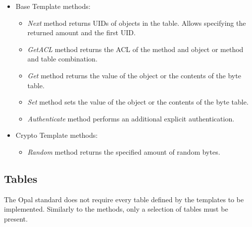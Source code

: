 \begin{itemize}
    \item Base Template methods:
\begin{itemize}
\item \emph{Next} method returns UIDs of objects in the table. Allows specifying the returned amount and the first UID.
\item \emph{GetACL} method returns the ACL of the method and object or method and table combination.
\item \emph{Get} method returns the value of the object or the contents of the byte table.
\item \emph{Set} method sets the value of the object or the contents of the byte table.
\item \emph{Authenticate} method performs an additional explicit authentication.
\end{itemize}
    \item Crypto Template methods:
\begin{itemize}
\item \emph{Random} method returns the specified amount of random bytes.
\end{itemize}
\end{itemize}

\subsection{Tables}
\label{admin_sp_tables}


The Opal standard does not require every table defined by the templates to be implemented. Similarly to the methods, only a selection of tables must be present.


